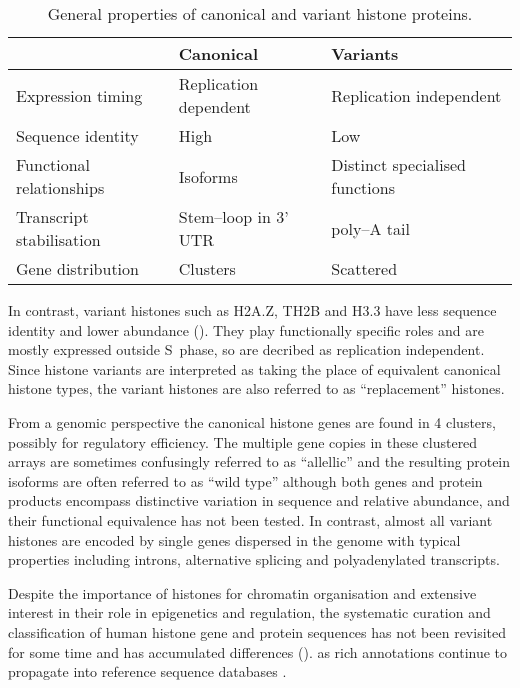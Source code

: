   \begin{table*}[hp]
    \caption{General properties of canonical and variant histone proteins.}
    \label{tab:typical-histone-differences}
    \centering
    \begin{tabular}{l l l}
      \toprule
      \null                     & Canonical             & Variants \\
      \midrule
      Expression timing         & Replication dependent & Replication independent \\
      Sequence identity         & High                  & Low \\
      Functional relationships  & Isoforms              & Distinct specialised functions \\
      Transcript stabilisation  & Stem--loop in 3' UTR  & poly--A tail \\
      Gene distribution         & Clusters              & Scattered \\
      \bottomrule
    \end{tabular}
  \end{table*}

  In contrast, variant histones such as H2A.Z, TH2B and H3.3 have 
  less sequence identity and lower abundance (). 
  They play functionally specific roles and are mostly expressed outside S~phase, 
  so are decribed as replication independent. 
  Since histone variants are interpreted as taking the place of equivalent canonical histone types, 
  the variant histones are also referred to as ``replacement'' histones.

  From a genomic perspective the canonical histone genes are found in 4 clusters, 
  possibly for regulatory efficiency. 
  The multiple gene copies in these clustered arrays are sometimes confusingly referred to as ``allellic'' 
  and the resulting protein isoforms are often referred to as ``wild type'' 
  although both genes and protein products encompass distinctive variation in sequence and relative abundance, 
  and their functional equivalence has not been tested.
  In contrast, almost all variant histones are encoded by single genes dispersed in the genome 
  with typical properties including introns, alternative splicing and polyadenylated transcripts.

  Despite the importance of histones for chromatin organisation and extensive interest
  in their role in epigenetics and regulation, the systematic curation and classification of human histone
  gene and protein sequences has not been revisited for some time \citep{Marzluff02}
  and has accumulated  differences ().
  as rich annotations continue to propagate into reference sequence databases .

